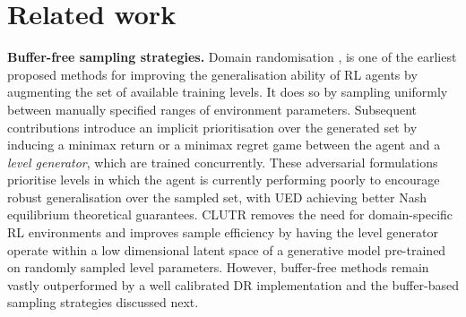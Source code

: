 \documentclass{article}
\theoremstyle{plain}
\theoremstyle{definition}
\theoremstyle{remark}
\begin{document}
\section{Related work}\label{sec:rw}
\textbf{Buffer-free sampling strategies.} Domain randomisation \citep[DR,][]{DR, DR1997}, is one of the earliest proposed methods for improving the generalisation ability of RL agents by augmenting the set of available training levels. It does so by sampling uniformly between manually specified ranges of environment parameters. Subsequent contributions introduce an implicit prioritisation over the generated set by inducing a minimax return \citep[robust adversarial RL,][]{Pinto2017RobustAdversarialRL} or a minimax regret game \citep[UED,][]{PAIRED} between the agent and a \textit{level generator}, which are trained concurrently. These adversarial formulations prioritise levels in which the agent is currently performing poorly to encourage robust generalisation over the sampled set, with UED achieving better Nash equilibrium theoretical guarantees. CLUTR \citep{CLUTR} removes the need for domain-specific RL environments and improves sample efficiency by having the level generator operate within a low dimensional latent space of a generative model pre-trained on randomly sampled level parameters. However, buffer-free methods remain vastly outperformed by a well calibrated DR implementation and the buffer-based sampling strategies discussed next.
\end{document}
